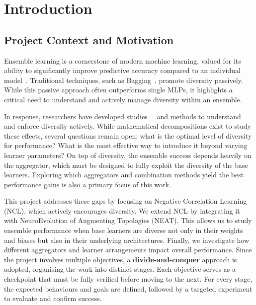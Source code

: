 \section{Introduction}
\label{sec:introduction}


\subsection{Project Context and Motivation}
Ensemble learning is a cornerstone of modern machine learning, valued for its ability to significantly improve predictive accuracy compared to an individual model~\cite{hansen2002neural}. Traditional techniques, such as Bagging~\cite{breiman1996bagging}, promote diversity passively. While this passive approach often outperforms single MLPs, it highlights a critical need to understand and actively manage diversity within an ensemble. 

In response, researchers have developed studies~\cite{liu1999ensemble}~\cite{wood2023unified} and methods to understand and enforce diversity actively. While mathematical decompositions exist to study these effects, several questions remain open: what is the optimal level of diversity for performance? What is the most effective way to introduce it beyond varying learner parameters? On top of diversity, the ensemble success depends heavily on the aggregator, which must be designed to fully exploit the diversity of the base learners. Exploring which aggregators and combination methods yield the best performance gains is also a primary focus of this work. 

This project addresses these gaps by focusing on Negative Correlation Learning (NCL), which actively encourages diversity. We extend NCL by integrating it with NeuroEvolution of Augmenting Topologies (NEAT). This allows us to study ensemble performance when base learners are diverse not only in their weights and biases but also in their underlying architectures. Finally, we investigate how different aggregators and learner arrangements impact overall performance. Since the project involves multiple objectives, a \textbf{divide-and-conquer} approach is adopted, organising the work into distinct stages. Each objective serves as a checkpoint that must be fully verified before moving to the next. For every stage, the expected behaviours and goals are defined, followed by a targeted experiment to evaluate and confirm success. 


